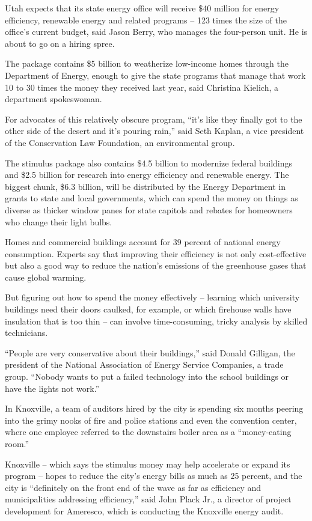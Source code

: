 \documentclass[12pt,a4paper,onecolumn]{article}
\begin{document}
\begin{CJK*}{GBK}{song}
Utah expects that its state energy office will receive \$40 million for energy efficiency, renewable
energy and related programs -- 123 times the size of the office's current budget, said Jason Berry,
who manages the four-person unit. He is about to go on a hiring spree.

The package contains \$5 billion to weatherize low-income homes through the Department of Energy,
enough to give the state programs that manage that work 10 to 30 times the money they received last
year, said Christina Kielich, a department spokeswoman.

For advocates of this relatively obscure program, ``it's like they finally got to the other side of
the desert and it's pouring rain,'' said Seth Kaplan, a vice president of the Conservation Law
Foundation, an environmental group.

The stimulus package also contains \$4.5 billion to modernize federal buildings and \$2.5 billion
for research into energy efficiency and renewable energy. The biggest chunk, \$6.3 billion, will be
distributed by the Energy Department in grants to state and local governments, which can spend the
money on things as diverse as thicker window panes for state capitols and rebates for homeowners who
change their light bulbs.

Homes and commercial buildings account for 39 percent of national energy consumption. Experts say
that improving their efficiency is not only cost-effective but also a good way to reduce the
nation's emissions of the greenhouse gases that cause global warming.

But figuring out how to spend the money effectively -- learning which university buildings need
their doors caulked, for example, or which firehouse walls have insulation that is too thin -- can
involve time-consuming, tricky analysis by skilled technicians.

``People are very conservative about their buildings,'' said Donald Gilligan, the president of the
National Association of Energy Service Companies, a trade group. ``Nobody wants to put a failed
technology into the school buildings or have the lights not work.''

In Knoxville, a team of auditors hired by the city is spending six months peering into the grimy
nooks of fire and police stations and even the convention center, where one employee referred to the
downstairs boiler area as a ``money-eating room.''

Knoxville -- which says the stimulus money may help accelerate or expand its program -- hopes to
reduce the city's energy bills as much as 25 percent, and the city is ``definitely on the front end
of the wave as far as efficiency and municipalities addressing efficiency,'' said John Plack Jr., a
director of project development for Ameresco, which is conducting the Knoxville energy audit.


\end{CJK*}
\end{document}
